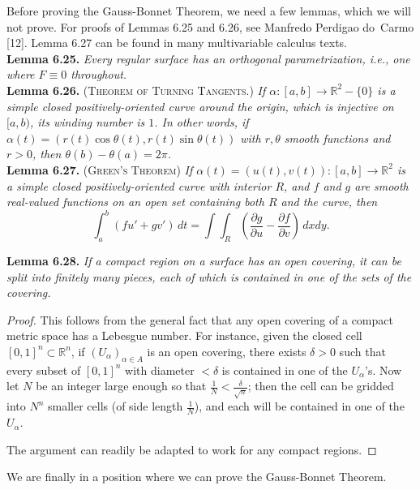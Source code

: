 \documentclass[leqno]{book}
\begin{document}
\noindent Before proving the Gauss-Bonnet Theorem, we need a few lemmas, which we will not prove.  For proofs of Lemmas 6.25 and 6.26, see Manfredo Perdigao do~Carmo [12].  Lemma 6.27 can be found in many multivariable calculus texts.\\

\noindent\textbf{Lemma 6.25.} \emph{Every regular surface has an orthogonal parametrization, i.e., one where $F\equiv 0$ throughout.}\\ %

\noindent\textbf{Lemma 6.26.} \textsc{(Theorem of Turning Tangents.)} \emph{If $\alpha:[a,b]\to\mathbb R^2-\{0\}$ is a simple closed positively-oriented curve around the origin, which is injective on $[a,b)$, its winding number is $1$.  In other words, if $\alpha(t)=(r(t)\cos\theta(t),r(t)\sin\theta(t))$ with $r,\theta$ smooth functions and $r>0$, then $\theta(b)-\theta(a)=2\pi$.}\\

\noindent\textbf{Lemma 6.27.} \textsc{(Green's Theorem)} \emph{If $\alpha(t)=(u(t),v(t)):[a,b]\to\mathbb R^2$ is a simple closed positively-oriented curve with interior $R$, and $f$ and $g$ are smooth real-valued functions on an open set containing both $R$ and the curve, then}
$$\int_a^b (fu'+gv')\,dt=\int\!\!\int_R\left(\frac{\partial g}{\partial u}-\frac{\partial f}{\partial v}\right)\,dxdy.$$

\noindent\textbf{Lemma 6.28.} \emph{If a compact region on a surface has an open covering, it can be split into finitely many pieces, each of which is contained in one of the sets of the covering.}
\begin{proof}
This follows from the general fact that any open covering of a compact metric space has a Lebesgue number.  For instance, given the closed cell $[0,1]^n\subset\mathbb R^n$, if $(U_\alpha)_{\alpha\in A}$ is an open covering, there exists $\delta>0$ such that every subset of $[0,1]^n$ with diameter $<\delta$ is contained in one of the $U_\alpha$'s.  Now let $N$ be an integer large enough so that $\frac 1N<\frac{\delta}{\sqrt n}$; then the cell can be gridded into $N^n$ smaller cells (of side length $\frac 1N$), and each will be contained in one of the $U_\alpha$.

The argument can readily be adapted to work for any compact regions.
\end{proof}

\noindent We are finally in a position where we can prove the Gauss-Bonnet Theorem.
\end{document}
